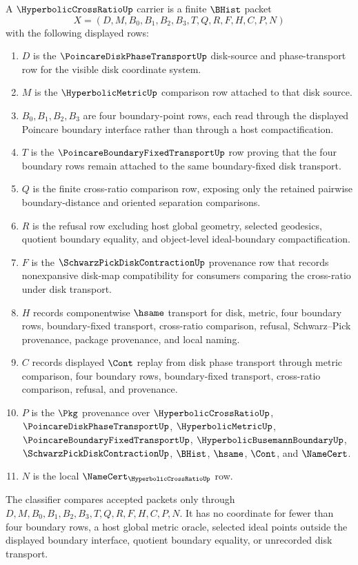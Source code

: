 \begin{definition}
\label{def:hyperbolic-cross-ratio-carrier}
A $\HyperbolicCrossRatioUp$ carrier is a finite $\BHist$ packet
$$
X=(D,M,B_0,B_1,B_2,B_3,T,Q,R,F,H,C,P,N)
$$
with the following displayed rows:
\begin{enumerate}
\item $D$ is the $\PoincareDiskPhaseTransportUp$ disk-source and phase-transport row for the visible disk coordinate system.
\item $M$ is the $\HyperbolicMetricUp$ comparison row attached to that disk source.
\item $B_0,B_1,B_2,B_3$ are four boundary-point rows, each read through the displayed Poincare boundary interface rather than through a host compactification.
\item $T$ is the $\PoincareBoundaryFixedTransportUp$ row proving that the four boundary rows remain attached to the same boundary-fixed disk transport.
\item $Q$ is the finite cross-ratio comparison row, exposing only the retained pairwise boundary-distance and oriented separation comparisons.
\item $R$ is the refusal row excluding host global geometry, selected geodesics, quotient boundary equality, and object-level ideal-boundary compactification.
\item $F$ is the $\SchwarzPickDiskContractionUp$ provenance row that records nonexpansive disk-map compatibility for consumers comparing the cross-ratio under disk transport.
\item $H$ records componentwise $\hsame$ transport for disk, metric, four boundary rows, boundary-fixed transport, cross-ratio comparison, refusal, Schwarz--Pick provenance, package provenance, and local naming.
\item $C$ records displayed $\Cont$ replay from disk phase transport through metric comparison, four boundary rows, boundary-fixed transport, cross-ratio comparison, refusal, and provenance.
\item $P$ is the $\Pkg$ provenance over $\HyperbolicCrossRatioUp$, $\PoincareDiskPhaseTransportUp$, $\HyperbolicMetricUp$, $\PoincareBoundaryFixedTransportUp$, $\HyperbolicBusemannBoundaryUp$, $\SchwarzPickDiskContractionUp$, $\BHist$, $\hsame$, $\Cont$, and $\NameCert$.
\item $N$ is the local $\NameCert_{\HyperbolicCrossRatioUp}$ row.
\end{enumerate}
The classifier compares accepted packets only through $D,M,B_0,B_1,B_2,B_3,T,Q,R,F,H,C,P,N$. It has no coordinate for fewer than four boundary rows, a host global metric oracle, selected ideal points outside the displayed boundary interface, quotient boundary equality, or unrecorded disk transport.
\end{definition}

